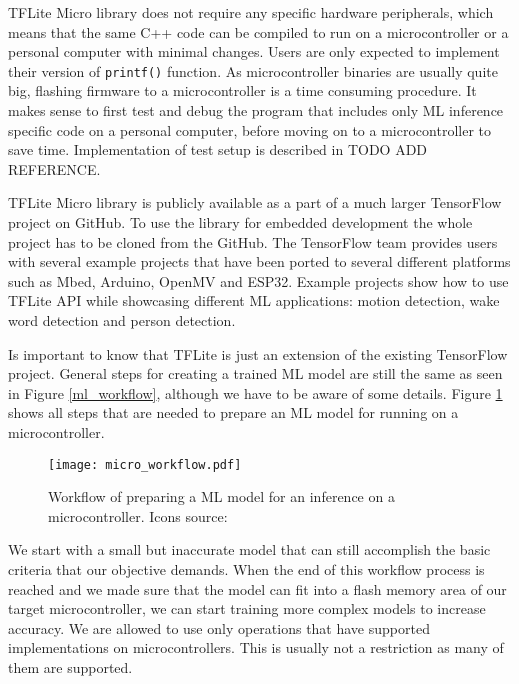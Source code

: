 TFLite Micro library does not require any specific hardware peripherals, which means that the same C++ code can be compiled to run on a microcontroller or a personal computer with minimal changes.
Users are only expected to implement their version of \verb|printf()| function.
As microcontroller binaries are usually quite big, flashing firmware to a microcontroller is a time consuming procedure.
It makes sense to first test and debug the program that includes only ML inference specific code on a personal computer, before moving on to a microcontroller to save time.
Implementation of test setup is described in TODO ADD REFERENCE.

TFLite Micro library is publicly available as a part of a much larger TensorFlow project on GitHub\cite{tensorflow_github}.
To use the library for embedded development the whole project has to be cloned from the GitHub.
The TensorFlow team provides users with several example projects that have been ported to several different platforms such as Mbed, Arduino, OpenMV and ESP32.
Example projects show how to use TFLite API while showcasing different ML applications: motion detection, wake word detection and person detection.

Is important to know that TFLite is just an extension of the existing TensorFlow project.
General steps for creating a trained ML model are still the same as seen in Figure \ref{ml_workflow}, although we have to be aware of some details.
Figure \ref{micro_workflow} shows all steps that are needed to prepare an ML model for running on a microcontroller.

\begin{figure}[ht] 
    \centering
    \texttt{[image: micro\_workflow.pdf]} 
    \caption[Workflow of preparing a ML model for an inference on a microcontroller.]{Workflow of preparing a ML model for an inference on a microcontroller. Icons source:\cite{icons}}
    \label{micro_workflow}
\end{figure}

We start with a small but inaccurate model that can still accomplish the basic criteria that our objective demands.
When the end of this workflow process is reached and we made sure that the model can fit into a flash memory area of our target microcontroller, we can start training more complex models to increase accuracy.
We are allowed to use only operations that have supported implementations on microcontrollers.
This is usually not a restriction as many of them are supported.

